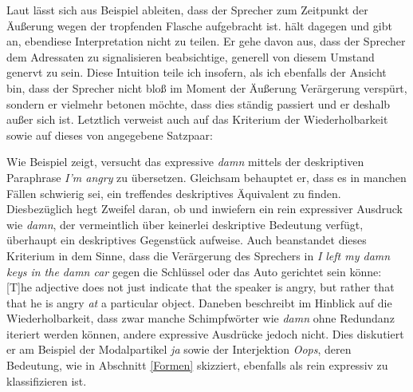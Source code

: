 Laut \citet[171]{Potts.2007a} lässt sich aus Beispiel  ableiten, dass der Sprecher zum Zeitpunkt der Äußerung wegen der tropfenden Flasche aufgebracht ist. {\citet[212]{Geurts.2007}} hält dagegen und gibt an, ebendiese Interpretation nicht zu teilen. Er gehe davon aus, dass der Sprecher dem Adressaten zu signalisieren beabsichtige, generell von diesem Umstand genervt zu sein. Diese Intuition teile ich insofern, als ich ebenfalls der Ansicht bin, dass der Sprecher nicht bloß im Moment der Äußerung Verärgerung verspürt, sondern er vielmehr betonen möchte, dass dies ständig passiert und er deshalb außer sich ist. Letztlich verweist \citet[213]{Geurts.2007} auch auf das Kriterium der Wiederholbarkeit sowie auf dieses von \citet[182]{Potts.2007a} {angegebene Satzpaar}:

\ea   \label{repeat}
 \z
 \z

Wie Beispiel  zeigt, versucht \citet[182]{Potts.2007a} das expressive \textit{damn} mittels der deskriptiven Paraphrase \textit{I'm angry} zu \glqq{}übersetzen\grqq{}. Gleichsam behauptet er, dass es in manchen Fällen schwierig sei, ein treffendes deskriptives Äquivalent zu finden. Diesbezüglich hegt {\citet[213]{Geurts.2007}} Zweifel daran, ob und inwiefern ein rein expressiver Ausdruck wie \textit{damn}, der vermeintlich über keinerlei deskriptive Bedeutung verfügt, überhaupt ein deskriptives Gegenstück aufweise. Auch \citet[240]{Schlenker.2007} beanstandet dieses Kriterium in dem Sinne, dass die Verärgerung des Sprechers in \textit{I left my damn keys in the damn car} gegen die Schlüssel oder das Auto gerichtet sein könne: \glqq{}[T]he adjective does not just indicate that the speaker is angry, but rather that that he is angry \textit{at} a particular object\grqq{}. Daneben beschreibt {\citet[17]{Gutzmann.2019a}} im Hinblick auf die Wiederholbarkeit, dass zwar manche Schimpfwörter wie \textit{damn} ohne Redundanz iteriert werden können, andere expressive Ausdrücke jedoch nicht. Dies diskutiert er am Beispiel der Modalpartikel \textit{ja} sowie der Interjektion \textit{Oops}, deren Bedeutung, wie in Abschnitt \ref{Formen} skizziert, ebenfalls als rein expressiv zu klassifizieren ist.

\ea   \label{repeat2}
 \z
 \z

